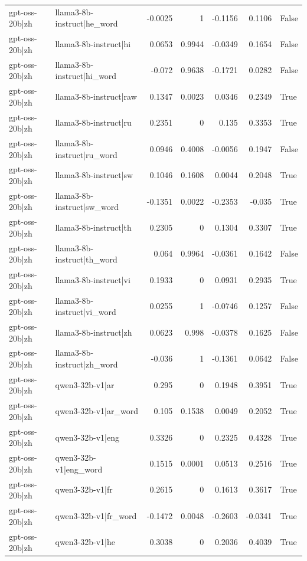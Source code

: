 \begin{table}
\begin{tabular}{l l r r r r l}
gpt-oss-20b|zh & llama3-8b-instruct|he_word & -0.0025 & 1 & -0.1156 & 0.1106 & False \\
gpt-oss-20b|zh & llama3-8b-instruct|hi & 0.0653 & 0.9944 & -0.0349 & 0.1654 & False \\
gpt-oss-20b|zh & llama3-8b-instruct|hi_word & -0.072 & 0.9638 & -0.1721 & 0.0282 & False \\
gpt-oss-20b|zh & llama3-8b-instruct|raw & 0.1347 & 0.0023 & 0.0346 & 0.2349 & True \\
gpt-oss-20b|zh & llama3-8b-instruct|ru & 0.2351 & 0 & 0.135 & 0.3353 & True \\
gpt-oss-20b|zh & llama3-8b-instruct|ru_word & 0.0946 & 0.4008 & -0.0056 & 0.1947 & False \\
gpt-oss-20b|zh & llama3-8b-instruct|sw & 0.1046 & 0.1608 & 0.0044 & 0.2048 & True \\
gpt-oss-20b|zh & llama3-8b-instruct|sw_word & -0.1351 & 0.0022 & -0.2353 & -0.035 & True \\
gpt-oss-20b|zh & llama3-8b-instruct|th & 0.2305 & 0 & 0.1304 & 0.3307 & True \\
gpt-oss-20b|zh & llama3-8b-instruct|th_word & 0.064 & 0.9964 & -0.0361 & 0.1642 & False \\
gpt-oss-20b|zh & llama3-8b-instruct|vi & 0.1933 & 0 & 0.0931 & 0.2935 & True \\
gpt-oss-20b|zh & llama3-8b-instruct|vi_word & 0.0255 & 1 & -0.0746 & 0.1257 & False \\
gpt-oss-20b|zh & llama3-8b-instruct|zh & 0.0623 & 0.998 & -0.0378 & 0.1625 & False \\
gpt-oss-20b|zh & llama3-8b-instruct|zh_word & -0.036 & 1 & -0.1361 & 0.0642 & False \\
gpt-oss-20b|zh & qwen3-32b-v1|ar & 0.295 & 0 & 0.1948 & 0.3951 & True \\
gpt-oss-20b|zh & qwen3-32b-v1|ar_word & 0.105 & 0.1538 & 0.0049 & 0.2052 & True \\
gpt-oss-20b|zh & qwen3-32b-v1|eng & 0.3326 & 0 & 0.2325 & 0.4328 & True \\
gpt-oss-20b|zh & qwen3-32b-v1|eng_word & 0.1515 & 0.0001 & 0.0513 & 0.2516 & True \\
gpt-oss-20b|zh & qwen3-32b-v1|fr & 0.2615 & 0 & 0.1613 & 0.3617 & True \\
gpt-oss-20b|zh & qwen3-32b-v1|fr_word & -0.1472 & 0.0048 & -0.2603 & -0.0341 & True \\
gpt-oss-20b|zh & qwen3-32b-v1|he & 0.3038 & 0 & 0.2036 & 0.4039 & True \\

\end{tabular}
\end{table}

